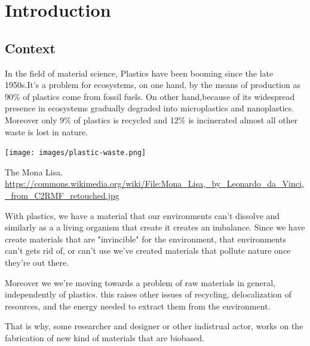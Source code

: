 \chapter{Introduction}

\section{Context}
In the field of material science, Plastics have been booming since the late 1950s\cite{geyer2017production}.It's a problem for ecosystems, on one hand, by the means of production as 90\% of plastics come from fossil fuels. On other hand,because of its widespread presence in ecosystems gradually degraded into microplastics and nanoplastics. Moreover only 9\% of plastics is recycled and 12\% is incinerated almost all other waste is lost in nature\cite{natureeditorial}.


\begin{marginfigure}[-5.5cm]
	\texttt{[image: images/plastic-waste.png]}
	\caption[The Mona Lisa]{The Mona Lisa.\\ 
	\url{https://commons.wikimedia.org/wiki/File:Mona_Lisa,_by_Leonardo_da_Vinci,_from_C2RMF_retouched.jpg}}
\end{marginfigure}



With plastics, we have a material that our environments can't dissolve and similarly as a a living organism that create it creates an imbalance. Since we have create materials that are "invincible" for the environment,  that environments can't gets rid of, or can't use we've created materials that pollute nature once they're out there.

Moreover we we're moving towards a problem of raw materials in general, independently of plastics. this raises other issues of recycling, delocalization of resources, and the energy needed to extract them from the environment.

That is why, some researcher and designer or other indistrual actor, works on the fabrication of new kind of materials that are biobased.
 
